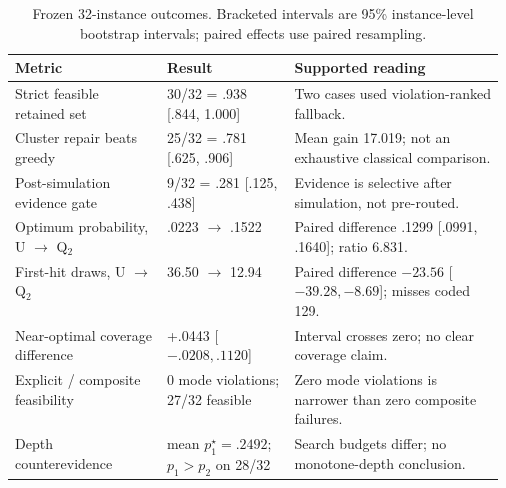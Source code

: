 \begin{table}[t]
\centering
\caption{Frozen 32-instance outcomes. Bracketed intervals are 95\% instance-level bootstrap intervals; paired effects use paired resampling.}
\label{tab:locked}
\scriptsize
\begin{tabularx}{\linewidth}{@{}p{0.31\linewidth}p{0.26\linewidth}X@{}}
\toprule
Metric & Result & Supported reading \\
\midrule
Strict feasible retained set & 30/32 = .938 [.844, 1.000] & Two cases used violation-ranked fallback. \\
Cluster repair beats greedy & 25/32 = .781 [.625, .906] & Mean gain 17.019; not an exhaustive classical comparison. \\
Post-simulation evidence gate & 9/32 = .281 [.125, .438] & Evidence is selective after simulation, not pre-routed. \\
Optimum probability, U $\rightarrow$ Q$_2$ & .0223 $\rightarrow$ .1522 & Paired difference .1299 [.0991, .1640]; ratio 6.831. \\
First-hit draws, U $\rightarrow$ Q$_2$ & 36.50 $\rightarrow$ 12.94 & Paired difference $-23.56$ [$-39.28,-8.69$]; misses coded 129. \\
Near-optimal coverage difference & +.0443 [$-.0208,.1120$] & Interval crosses zero; no clear coverage claim. \\
Explicit / composite feasibility & 0 mode violations; 27/32 feasible & Zero mode violations is narrower than zero composite failures. \\
Depth counterevidence & mean $p_1^\star=.2492$; $p_1>p_2$ on 28/32 & Search budgets differ; no monotone-depth conclusion. \\
\bottomrule
\end{tabularx}
\end{table}
